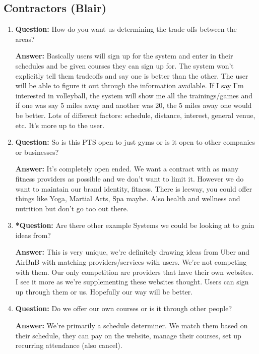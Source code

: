\documentclass[12pt]{article}
\begin{document}
\subsection{Contractors (Blair)}
\begin{enumerate}
\item \textbf{Question:}  How do you want us determining the trade offs between the areas?

\textbf{Answer:}  Basically users will sign up for the system and enter in their schedules and be given courses they can sign up for.  The system won’t explicitly tell them tradeoffs and say one is better than the other.  The user will be able to figure it out through the information available.  If I say I’m interested in volleyball, the system will show me all the trainings/games and if one was say 5 miles away and another was 20, the 5 miles away one would be better.  Lots of different factors: schedule, distance, interest, general venue, etc.  It’s more up to the user.

\item \textbf{Question:} So is this PTS open to just gyms or is it open to other companies or businesses?

\textbf{Answer:} It’s completely open ended.  We want a contract with as many fitness providers as possible and we don’t want to limit it.  However we do want to maintain our brand identity, fitness.  There is leeway, you could offer things like Yoga, Martial Arts, Spa maybe.  Also health and wellness and nutrition but don’t go too out there.

\item \textbf{*Question:} Are there other example Systems we could be looking at to gain ideas from?

\textbf{Answer:} This is very unique, we’re definitely drawing ideas from Uber and AirBnB with matching providers/services with users.  We’re not competing with them.  Our only competition are providers that have their own websites. I see it more as we’re supplementing these websites thought. Users can sign up through them or us.  Hopefully our way will be better.

\item \textbf{Question:} Do we offer our own courses or is it through other people?

\textbf{Answer:} We’re primarily a schedule determiner.  We match them based on their schedule, they can pay on the website, manage their courses, set up recurring attendance (also cancel).


\end{enumerate}
\end{document}
